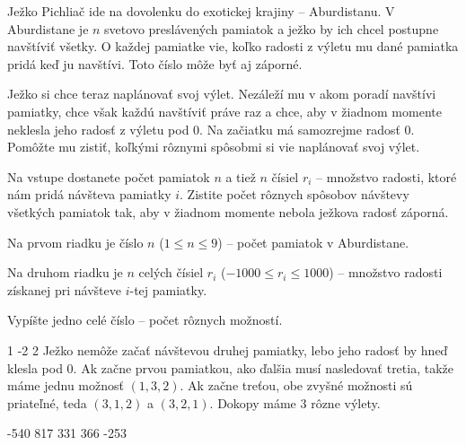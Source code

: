 




Ježko Pichliač ide na dovolenku do exotickej krajiny -- Aburdistanu. V Aburdistane je $n$ svetovo
preslávených pamiatok a ježko by ich chcel postupne navštíviť všetky. O každej pamiatke vie, koľko
radosti z výletu mu dané pamiatka pridá keď ju navštívi. Toto číslo môže byť aj záporné.

Ježko si chce teraz naplánovať svoj výlet. Nezáleží mu v akom poradí navštívi pamiatky, chce však
každú navštíviť práve raz a chce, aby v žiadnom momente neklesla jeho radosť z výletu pod $0$. Na
začiatku má samozrejme radosť $0$. Pomôžte mu zistiť, koľkými rôznymi spôsobmi si vie naplánovať
svoj výlet.


Na vstupe dostanete počet pamiatok $n$ a tiež $n$ čísiel $r_i$ -- množstvo radosti, ktoré nám pridá
návšteva pamiatky $i$. Zistite počet rôznych spôsobov návštevy všetkých pamiatok tak, aby v žiadnom
momente nebola ježkova radosť záporná.


Na prvom riadku je číslo $n$ ($1 \leq n \leq 9$) -- počet pamiatok v Aburdistane.

Na druhom riadku je $n$ celých čísiel $r_i$ ($-1000 \leq r_i \leq 1000$) -- množstvo radosti
získanej pri návšteve $i$-tej pamiatky.


Vypíšte jedno celé číslo -- počet rôznych možností.


1 -2 2
\komentar
Ježko nemôže začať návštevou druhej pamiatky, lebo jeho radosť by hneď klesla pod $0$. Ak začne
prvou pamiatkou, ako ďalšia musí nasledovať tretia, takže máme jednu možnosť $(1, 3, 2)$. Ak začne
treťou, obe zvyšné možnosti sú priateľné, teda $(3, 1, 2)$ a $(3, 2, 1)$. Dokopy máme $3$ rôzne
výlety.
\koniec

-540 817 331 366 -253
\koniec


